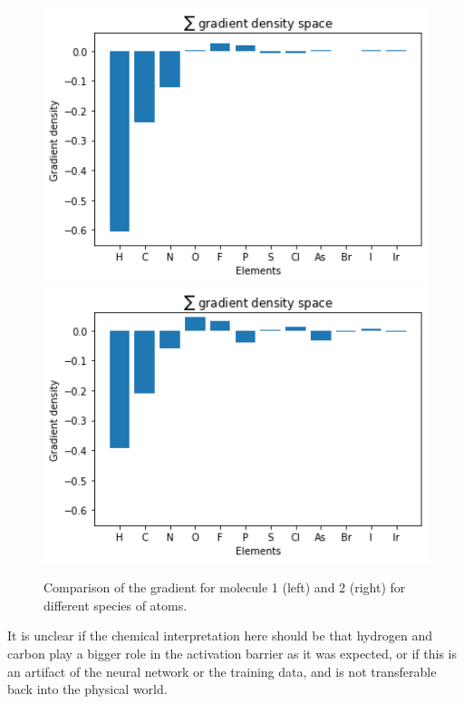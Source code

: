 \begin{figure}[!htb]
    \includegraphics[width=1.0\textwidth]{figures/evaluation/elem2-GRAD.png}
  \endminipage\hfill
    \includegraphics[width=1.0\textwidth]{figures/evaluation/elem1-GRAD.png}
  \endminipage\hfill
  \caption[Comparison of summed gradients]{
    Comparison of the gradient for molecule 1 (left) and 2 (right) for different species of atoms.
  }
  \label{fig:snap_global_gradient}

\end{figure}


It is unclear if the chemical interpretation here should be that hydrogen and carbon play a bigger role in the activation
barrier as it was expected, or if this is an artifact of the neural network or the training data, and is not transferable back into 
the physical world.

